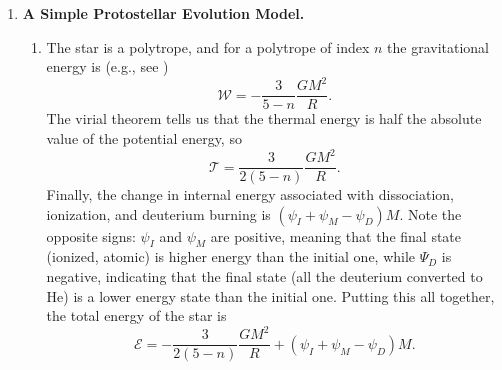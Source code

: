 \solutionset

\begin{enumerate}

\item {\bf A Simple Protostellar Evolution Model.}

\begin{enumerate}

\item The star is a polytrope, and for a polytrope of index $n$ the gravitational energy is (e.g., see \citealt{kippenhahn94a})
\begin{displaymath}
\mathcal{W} = -\frac{3}{5-n} \frac{G M^2}{R}.
\end{displaymath}
The virial theorem tells us that the thermal energy is half the absolute value of the potential energy, so
\begin{displaymath}
\mathcal{T} = \frac{3}{2(5-n)} \frac{G M^2}{R}.
\end{displaymath}
Finally, the change in internal energy associated with dissociation, ionization, and deuterium burning is $(\psi_I  + \psi_M - \psi_D) M$. Note the opposite signs: $\psi_I$ and $\psi_M$ are positive, meaning that the final state (ionized, atomic) is higher energy than the initial one, while $\Psi_D$ is negative, indicating that the final state (all the deuterium converted to He) is a lower energy state than the initial one. Putting this all together, the total energy of the star is
\begin{displaymath}
\mathcal{E} = -\frac{3}{2(5-n)} \frac{G M^2}{R} + (\psi_I  + \psi_M - \psi_D) M.
\end{displaymath}


\end{enumerate}
\end{enumerate}
